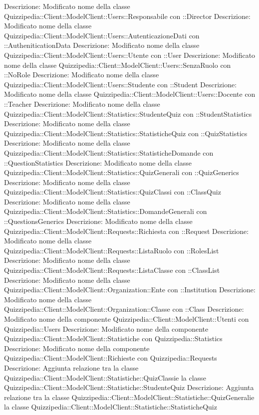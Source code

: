 Descrizione: Modificato nome della classe Quizzipedia::Client::ModelClient::Users::Responsabile con ::Director 
Descrizione: Modificato nome della classe Quizzipedia::Client::ModelClient::Users::AutenticazioneDati con ::AutheniticationData 
Descrizione: Modificato nome della classe Quizzipedia::Client::ModelClient::Users::Utente con ::User 
Descrizione: Modificato nome della classe Quizzipedia::Client::ModelClient::Users::SenzaRuolo con ::NoRole 
Descrizione: Modificato nome della classe Quizzipedia::Client::ModelClient::Users::Studente con ::Student 
Descrizione: Modificato nome della classe Quizzipedia::Client::ModelClient::Users::Docente con ::Teacher 
Descrizione: Modificato nome della classe Quizzipedia::Client::ModelClient::Statistics::StudenteQuiz con ::StudentStatistics 
Descrizione: Modificato nome della classe Quizzipedia::Client::ModelClient::Statistics::StatisticheQuiz con ::QuizStatistics 
Descrizione: Modificato nome della classe Quizzipedia::Client::ModelClient::Statistics::StatisticheDomande con ::QuestionStatistics 
Descrizione: Modificato nome della classe Quizzipedia::Client::ModelClient::Statistics::QuizGenerali con ::QuizGenerics 
Descrizione: Modificato nome della classe Quizzipedia::Client::ModelClient::Statistics::QuizClassi con ::ClassQuiz 
Descrizione: Modificato nome della classe Quizzipedia::Client::ModelClient::Statistics::DomandeGenerali con ::QuestionsGenerics 
Descrizione: Modificato nome della classe Quizzipedia::Client::ModelClient::Requests::Richiesta con ::Request 
Descrizione: Modificato nome della classe Quizzipedia::Client::ModelClient::Requests::ListaRuolo con ::RolesList 
Descrizione: Modificato nome della classe Quizzipedia::Client::ModelClient::Requests::ListaClasse con ::ClassList 
Descrizione: Modificato nome della classe Quizzipedia::Client::ModelClient::Organization::Ente con ::Institution 
Descrizione: Modificato nome della classe Quizzipedia::Client::ModelClient::Organization::Classe con ::Class 
Descrizione: Modificato nome della componente Quizzipedia::Client::ModelClient::Utenti con Quizzipedia::Users 
Descrizione: Modificato nome della componente Quizzipedia::Client::ModelClient::Statistiche con Quizzipedia::Statistics 
Descrizione: Modificato nome della componente Quizzipedia::Client::ModelClient::Richieste con Quizzipedia::Requests 
Descrizione: Aggiunta relazione tra la classe Quizzipedia::Client::ModelClient::Statistiche::QuizClassie la classe Quizzipedia::Client::ModelClient::Statistiche::StudenteQuiz 
Descrizione: Aggiunta relazione tra la classe Quizzipedia::Client::ModelClient::Statistiche::QuizGeneralie la classe Quizzipedia::Client::ModelClient::Statistiche::StatisticheQuiz 
